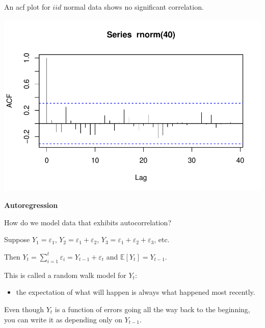 \documentclass[12pt,xcolor=svgnames]{beamer}
\newcommand{\rd}{\color{red}}
\newcommand{\fg}{\color{ForestGreen}}
\newcommand{\bl}{\color{blue}}
\newcommand{\theme}{\color{FireBrick}}
\newcommand{\ds}[1]{\mathds{#1}}
\newcommand{\sk}{\vspace{.4cm}}
\newcommand{\nochap}{\vspace{0.5cm}}
\newcommand{\chap}[1]{{\theme \Large \bf #1} \sk}
\newcommand{\E}{\ds{E}}
\begin{document}
\begin{frame}
\nochap

An acf plot for {\fg $iid$ normal data} shows no significant correlation.

\begin{center}
\includegraphics[scale=0.68,trim=10 25 0 15]{normacf_new}
\end{center}

\end{frame}


\begin{frame}
\chap{Autoregression}

{\bl How do we model data that exhibits autocorrelation?}

\sk 
Suppose $Y_1 = \varepsilon_1$, $Y_2 = \varepsilon_{1} +
\varepsilon_{2}$, $Y_3 = \varepsilon_{1} + \varepsilon_{2} +
\varepsilon_{3}$, etc.

\begin{center}
\bl Then 
$Y_t =  \sum_{i=1}^{t}\varepsilon_i = Y_{t-1} + \varepsilon_t$ and $\E[Y_t] = Y_{t-1}$.
\end{center}

\vspace{0.1cm}
This is called a {\rd random walk} model for $Y_t$: 
\begin{itemize}
\item the expectation of what will happen is always what happened most recently.
\end{itemize}

\sk
Even though $Y_t$ is a function of errors going all the way back to the 
beginning, you can write it as depending only on $Y_{t-1}$.
\end{frame}
\end{document}
